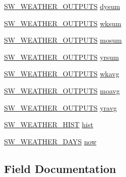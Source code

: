\begin{DoxyCompactItemize}
\hyperlink{struct_s_w___w_e_a_t_h_e_r___o_u_t_p_u_t_s}{S\+W\+\_\+\+W\+E\+A\+T\+H\+E\+R\+\_\+\+O\+U\+T\+P\+U\+TS} \hyperlink{struct_s_w___w_e_a_t_h_e_r_a761cd55309013cec80256c3a6cbbc6d0}{dysum}
\item 
\hyperlink{struct_s_w___w_e_a_t_h_e_r___o_u_t_p_u_t_s}{S\+W\+\_\+\+W\+E\+A\+T\+H\+E\+R\+\_\+\+O\+U\+T\+P\+U\+TS} \hyperlink{struct_s_w___w_e_a_t_h_e_r_ae5d8febadccca16df669d1ca8b12041a}{wksum}
\item 
\hyperlink{struct_s_w___w_e_a_t_h_e_r___o_u_t_p_u_t_s}{S\+W\+\_\+\+W\+E\+A\+T\+H\+E\+R\+\_\+\+O\+U\+T\+P\+U\+TS} \hyperlink{struct_s_w___w_e_a_t_h_e_r_a6b689e645a924b30dd9a57520041c845}{mosum}
\item 
\hyperlink{struct_s_w___w_e_a_t_h_e_r___o_u_t_p_u_t_s}{S\+W\+\_\+\+W\+E\+A\+T\+H\+E\+R\+\_\+\+O\+U\+T\+P\+U\+TS} \hyperlink{struct_s_w___w_e_a_t_h_e_r_a07a5a49263519fac3a77224545c22147}{yrsum}
\item 
\hyperlink{struct_s_w___w_e_a_t_h_e_r___o_u_t_p_u_t_s}{S\+W\+\_\+\+W\+E\+A\+T\+H\+E\+R\+\_\+\+O\+U\+T\+P\+U\+TS} \hyperlink{struct_s_w___w_e_a_t_h_e_r_a6125c910aea131843c0faa4d8e41637a}{wkavg}
\item 
\hyperlink{struct_s_w___w_e_a_t_h_e_r___o_u_t_p_u_t_s}{S\+W\+\_\+\+W\+E\+A\+T\+H\+E\+R\+\_\+\+O\+U\+T\+P\+U\+TS} \hyperlink{struct_s_w___w_e_a_t_h_e_r_a0ed19288618188bf6ee97b79e933825f}{moavg}
\item 
\hyperlink{struct_s_w___w_e_a_t_h_e_r___o_u_t_p_u_t_s}{S\+W\+\_\+\+W\+E\+A\+T\+H\+E\+R\+\_\+\+O\+U\+T\+P\+U\+TS} \hyperlink{struct_s_w___w_e_a_t_h_e_r_a390d116f1633413caff92d1268a9b5b0}{yravg}
\item 
\hyperlink{struct_s_w___w_e_a_t_h_e_r___h_i_s_t}{S\+W\+\_\+\+W\+E\+A\+T\+H\+E\+R\+\_\+\+H\+I\+ST} \hyperlink{struct_s_w___w_e_a_t_h_e_r_abc15c2db7b608c36e2e2d05d1088ccd5}{hist}
\item 
\hyperlink{struct_s_w___w_e_a_t_h_e_r__2_d_a_y_s}{S\+W\+\_\+\+W\+E\+A\+T\+H\+E\+R\+\_\+D\+A\+YS} \hyperlink{struct_s_w___w_e_a_t_h_e_r_abaaf1b1d5637c6395b97ffc856a51b94}{now}
\end{DoxyCompactItemize}


\subsection{Field Documentation}
\mbox{\label{struct_s_w___w_e_a_t_h_e_r_aaf64b49da6982da69e2c4e2da6b49543}} 
